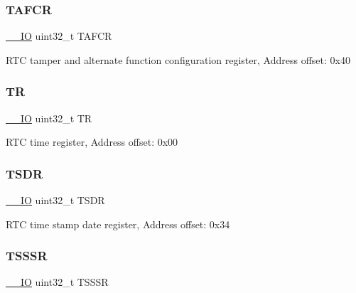\subsubsection{\texorpdfstring{T\+A\+F\+CR}{TAFCR}}
{\footnotesize\ttfamily \mbox{\hyperlink{core__sc300_8h_aec43007d9998a0a0e01faede4133d6be}{\+\_\+\+\_\+\+IO}} uint32\+\_\+t T\+A\+F\+CR}

R\+TC tamper and alternate function configuration register, Address offset\+: 0x40 \mbox{\label{struct_r_t_c___type_def_a63d179b7a36a715dce7203858d3be132}} 
\subsubsection{\texorpdfstring{TR}{TR}}
{\footnotesize\ttfamily \mbox{\hyperlink{core__sc300_8h_aec43007d9998a0a0e01faede4133d6be}{\+\_\+\+\_\+\+IO}} uint32\+\_\+t TR}

R\+TC time register, Address offset\+: 0x00 \mbox{\label{struct_r_t_c___type_def_abeb6fb580a8fd128182aa9ba2738ac2c}} 
\subsubsection{\texorpdfstring{T\+S\+DR}{TSDR}}
{\footnotesize\ttfamily \mbox{\hyperlink{core__sc300_8h_aec43007d9998a0a0e01faede4133d6be}{\+\_\+\+\_\+\+IO}} uint32\+\_\+t T\+S\+DR}

R\+TC time stamp date register, Address offset\+: 0x34 \mbox{\label{struct_r_t_c___type_def_a1d6c2bc4c067d6a64ef30d16a5925796}} 
\subsubsection{\texorpdfstring{T\+S\+S\+SR}{TSSSR}}
{\footnotesize\ttfamily \mbox{\hyperlink{core__sc300_8h_aec43007d9998a0a0e01faede4133d6be}{\+\_\+\+\_\+\+IO}} uint32\+\_\+t T\+S\+S\+SR}

